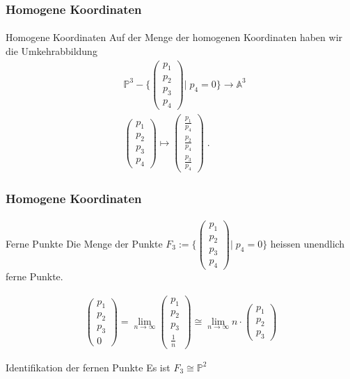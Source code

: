 \documentclass{beamer}
\begin{document}
\begin{frame}
    \frametitle{Homogene Koordinaten}
\framesubtitle{}
\begin{block}{Homogene Koordinaten}
Auf der Menge der homogenen Koordinaten haben wir die Umkehrabbildung
\begin{align*}
& \mathbb{P}^3 - \Biggl \{\begin{pmatrix} p_1 \\ p_2 \\ p_3  \\ p_4 \end{pmatrix}\Bigg | \; p_{4} = 0 \Biggr \}   \to \mathbb{A}^3 \\
& \begin{pmatrix} p_1 \\ p_2 \\ p_3  \\  p_{4} \end{pmatrix}   \mapsto \begin{pmatrix}  \frac{p_1}{ p_{4}} \\ \frac{p_2}{ p_{4}}  \\ \frac{p_3}{ p_{4}}  \end{pmatrix}  \; .
\end{align*}
\end{block}
\end{frame}


\begin{frame}
    \frametitle{Homogene Koordinaten}
\framesubtitle{}
\begin{block}{Ferne Punkte}
Die Menge der Punkte $F_3 := \Biggl \{\begin{pmatrix} p_1 \\ p_2 \\ p_3  \\ p_4 \end{pmatrix}\Bigg | \; p_{4} = 0 \Biggr \} $ heissen unendlich ferne Punkte.

\begin{align*}
 \begin{pmatrix} p_1 \\ p_2 \\ p_3  \\ 0 \end{pmatrix}  =\lim_{n \to \infty} \begin{pmatrix} p_1 \\ p_2 \\ p_3  \\ \frac{1}{n} \end{pmatrix}  \cong  \lim_{n \to \infty} n \cdot  \begin{pmatrix} p_1 \\ p_2 \\ p_3 \end{pmatrix} 
\end{align*}
\end{block}

\begin{block}{Identifikation der fernen Punkte}
Es ist $F_3 \cong \mathbb{P}^2$
\end{block}
\end{frame}
\end{document}

